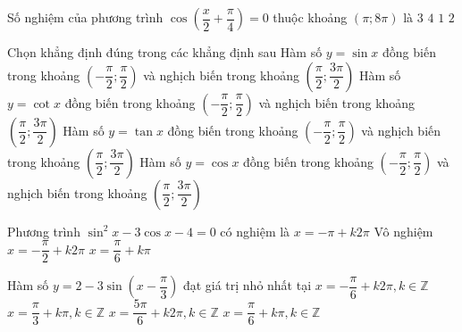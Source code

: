 \begin{ex}%
Số nghiệm của phương trình $\cos \left (\dfrac{x}{2}+\dfrac{\pi}{4}\right )=0$ thuộc khoảng $(\pi;8\pi)$ là
\choice
{\True $3$}
{$4$}
{$1$}
{$2$}
\end{ex}

\begin{ex}%
Chọn khẳng định đúng trong các khẳng định sau
\choice
{\True Hàm số $y=\sin x$ đồng biến trong khoảng $\left (-\dfrac{\pi}{2};\dfrac{\pi}{2}\right )$ và nghịch biến trong khoảng $\left (\dfrac{\pi}{2};\dfrac{3\pi}{2}\right )$} 
{Hàm số $y=\cot x$ đồng biến trong khoảng $\left (-\dfrac{\pi}{2};\dfrac{\pi}{2}\right )$ và nghịch biến trong khoảng $\left (\dfrac{\pi}{2};\dfrac{3\pi}{2}\right )$}
{Hàm số $y=\tan x$ đồng biến trong khoảng $\left (-\dfrac{\pi}{2};\dfrac{\pi}{2}\right )$ và nghịch biến trong khoảng $\left (\dfrac{\pi}{2};\dfrac{3\pi}{2}\right )$}
{Hàm số $y=\cos  x$ đồng biến trong khoảng $\left (-\dfrac{\pi}{2};\dfrac{\pi}{2}\right )$ và nghịch biến trong khoảng $\left (\dfrac{\pi}{2};\dfrac{3\pi}{2}\right )$}
\end{ex}

\begin{ex}%
Phương trình $\sin^2x-3\cos x-4=0$ có nghiệm là
\choice
{$x=-\pi +k2\pi$}
{\True Vô nghiệm}
{$x=-\dfrac{\pi}{2} +k2\pi$}
{$x=\dfrac{\pi}{6} +k\pi$}
\end{ex}

\begin{ex}%
Hàm số $y=2-3\sin \left (x-\dfrac{\pi}{3}\right )$ đạt giá trị nhỏ nhất tại
\choice
{$x=-\dfrac{\pi}{6}+k2\pi,k\in \mathbb{Z}$}
{$x=\dfrac{\pi}{3}+k\pi,k\in \mathbb{Z}$}
{\True $x=\dfrac{5\pi}{6}+k2\pi,k\in \mathbb{Z}$}
{$x=\dfrac{\pi}{6}+k\pi,k\in \mathbb{Z}$}
\end{ex}

